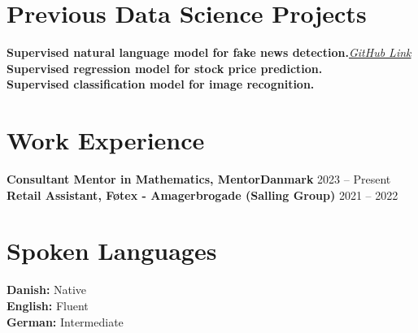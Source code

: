 \documentclass[a4paper,10pt]{article}
\begin{document}
\section*{Previous Data Science Projects}
\textbf{Supervised natural language model for fake news detection.}\quad \href{https://github.com/P1N60/gdsProjekt}{\textit{GitHub Link}} \\
\textbf{Supervised regression model for stock price prediction.} \\
\textbf{Supervised classification model for image recognition.}

\section*{Work Experience}
\textbf{Consultant Mentor in Mathematics, MentorDanmark} \hfill 2023 -- Present \\
\textbf{Retail Assistant, F\o tex - Amagerbrogade (Salling Group)} \hfill 2021 -- 2022

\section*{Spoken Languages}
\textbf{Danish:} Native \\
\textbf{English:} Fluent \\
\textbf{German:} Intermediate
\end{document}

